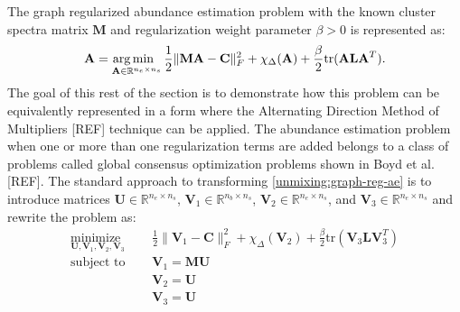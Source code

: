 The graph regularized abundance estimation problem with the known cluster spectra matrix $\mathbf{M}$ and regularization weight parameter $\beta > 0$ is represented as:
\begin{equation}
    \label{unmixing:graph-reg-ae}
    \mathbf{A} = \operatorname*{arg\,min \;\;}_{\mathbf{A} \in \mathbb{R}^{n_e \times n_s}} \frac{1}{2}\|\mathbf{MA} - \mathbf{C}\|_F^2 + \chi_\Delta(\mathbf{A}) + \frac{\beta}{2}\text{tr}(\mathbf{ALA}^T).
\end{equation}
The goal of this rest of the section is to demonstrate how this problem can be equivalently represented in a form where the Alternating Direction Method of Multipliers [REF] technique can be applied. The abundance estimation problem when one or more than one regularization terms are added belongs to a class of problems called global consensus optimization problems shown in Boyd et al. [REF]. The standard approach to transforming \eqref{unmixing:graph-reg-ae} is to introduce matrices $\mathbf{U} \in \mathbb{R}^{n_e \times n_s}$, $\mathbf{V}_1 \in \mathbb{R}^{n_b \times n_s}$, $\mathbf{V}_2 \in \mathbb{R}^{n_e \times n_s}$, and $\mathbf{V}_{3} \in \mathbb{R}^{n_e \times n_s}$ and rewrite the problem as:
\begin{equation}
    \label{unmixing:graph-reg-ae-admm-1}
    \begin{aligned}
        \underset{\mathbf{U}, \mathbf{V}_1, \mathbf{V}_2, \mathbf{V}_3}{\text{minimize }} & \quad \frac{1}{2} \|\mathbf{V}_1 - \mathbf{C} \|_F^2 + \chi_{\Delta}(\mathbf{V}_2) + \frac{\beta}{2}\text{tr}(\mathbf{V}_3 \mathbf{L} \mathbf{V}_3^T) 
        \\         
        \text{subject to } &  \quad \mathbf{V}_1 = \mathbf{MU} \\
        & \quad \mathbf{V}_2 = \mathbf{U} \\
        & \quad \mathbf{V}_{3} = \mathbf{U}
   \end{aligned}
\end{equation}

